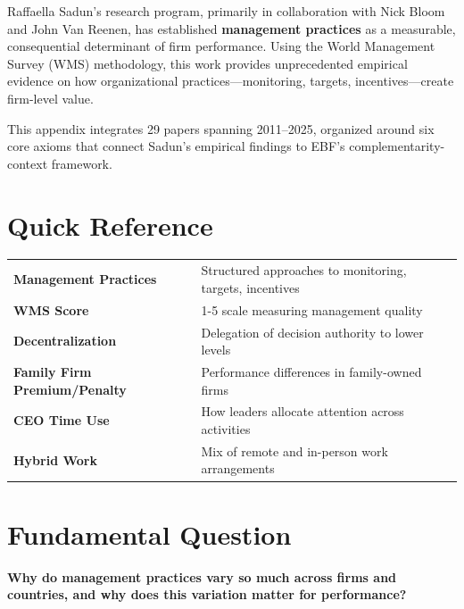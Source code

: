 Raffaella Sadun's research program, primarily in collaboration with Nick Bloom
and John Van Reenen, has established \textbf{management practices} as a
measurable, consequential determinant of firm performance. Using the World
Management Survey (WMS) methodology, this work provides unprecedented
empirical evidence on how organizational practices---monitoring, targets,
incentives---create firm-level value.

This appendix integrates 29 papers spanning 2011--2025, organized around six
core axioms that connect Sadun's empirical findings to EBF's
complementarity-context framework.

\section{Quick Reference}

\begin{tcolorbox}[colback=yellow!5!white, colframe=yellow!75!black, title=Key Concepts]
\begin{tabular}{@{}ll@{}}
\textbf{Management Practices} & Structured approaches to monitoring, targets, incentives \\
\textbf{WMS Score} & 1-5 scale measuring management quality \\
\textbf{Decentralization} & Delegation of decision authority to lower levels \\
\textbf{Family Firm Premium/Penalty} & Performance differences in family-owned firms \\
\textbf{CEO Time Use} & How leaders allocate attention across activities \\
\textbf{Hybrid Work} & Mix of remote and in-person work arrangements \\
\end{tabular}
\end{tcolorbox}

\section{Fundamental Question}

\begin{tcolorbox}[colback=red!5!white, colframe=red!75!black,
    title=The Sadun Question]
\centering\Large
\textbf{Why do management practices vary so much across firms and countries,
and why does this variation matter for performance?}
\end{tcolorbox}

